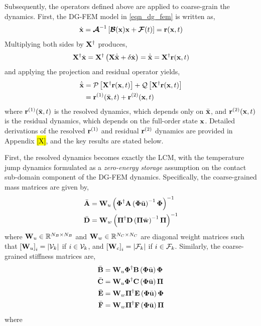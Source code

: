 Subsequently, the operators defined above are applied to coarse-grain the dynamics. First, the DG-FEM model in \cref{eqn_dg_fem} is written as,
\begin{equation}
    \dot{\mathbf{x}} = \boldsymbol{\mathcal{A}}^{-1}\left[\boldsymbol{\mathcal{B}}(\mathbf{x})\mathbf{x} + \boldsymbol{\mathcal{F}}(t)\right] = \mathbf{r}(\mathbf{x},t)
\end{equation}
Multiplying both sides by $\mathbf{X}^{\dagger}$ produces,
\begin{equation}
    \mathbf{X}^{\dagger}\dot{\mathbf{x}} = \mathbf{X}^{\dagger}\left(\mathbf{X}\dot{\bar{\mathbf{x}}} + \delta\dot{\mathbf{x}}\right) = \dot{\bar{\mathbf{x}}} = \mathbf{X}^{\dagger}\mathbf{r}(\mathbf{x},t)
\end{equation}
and applying the projection and residual operator yields,
\begin{subequations}
    \begin{align}
        \dot{\bar{\mathbf{x}}} &= \mathcal{P}\left[\mathbf{X}^{\dagger}\mathbf{r}(\mathbf{x},t)\right] + \mathcal{Q}\left[\mathbf{X}^{\dagger}\mathbf{r}(\mathbf{x},t)\right]\\
        &= \mathbf{r}^{(1)}(\bar{\mathbf{x}},t) + \mathbf{r}^{(2)}(\mathbf{x},t)
    \end{align}
\end{subequations}
where $\mathbf{r}^{(1)}(\bar{\mathbf{x}},t)$ is the resolved dynamics, which depends only on $\bar{\mathbf{x}}$, and $\mathbf{r}^{(2)}(\mathbf{x},t)$ is the residual dynamics, which depends on the full-order state $\mathbf{x}$. Detailed derivations of the resolved $\mathbf{r}^{(1)}$ and residual $\mathbf{r}^{(2)}$ dynamics are provided in Appendix \hl{[X]}, and the key results are stated below.

First, the resolved dynamics becomes exactly the LCM, with the temperature jump dynamics formulated as a \emph{zero-energy storage} assumption on the contact sub-domain component of the DG-FEM dynamics. Specifically, the coarse-grained mass matrices are given by,
\begin{subequations}
    \begin{align}
        \bar{\mathbf{A}} &= \mathbf{W}_u\left(\boldsymbol{\Phi}^{\dagger}\mathbf{A}\left(\boldsymbol{\Phi}\bar{\mathbf{u}}\right)^{-1}\boldsymbol{\Phi}\right)^{-1}\\
        \bar{\mathbf{D}} &= \mathbf{W}_w\left(\boldsymbol{\Pi}^{\dagger}\mathbf{D}\left(\boldsymbol{\Pi}\bar{\mathbf{w}}\right)^{-1}\boldsymbol{\Pi}\right)^{-1}
    \end{align}
\end{subequations}
where $\mathbf{W}_u\in\mathbb{R}^{N_B\times N_B}$ and $\mathbf{W}_w\in\mathbb{R}^{N_C\times N_C}$ are diagonal weight matrices such that $\left[\mathbf{W}_u\right]_{i} = \left|\mathcal{V}_k\right|$ if $i\in\mathcal{V}_k$, and $\left[\mathbf{W}_c\right]_i=\left|\mathcal{F}_k\right|$ if $i\in\mathcal{F}_k$. Similarly, the coarse-grained stiffness matrices are,
\begin{subequations}
    \begin{align}
        \bar{\mathbf{B}} &= \mathbf{W}_u\boldsymbol{\Phi}^{\dagger}\mathbf{B}\left(\boldsymbol{\Phi}\bar{\mathbf{u}}\right)\boldsymbol{\Phi}\\
        \bar{\mathbf{C}} &= \mathbf{W}_u\boldsymbol{\Phi}^{\dagger}\mathbf{C}\left(\boldsymbol{\Phi}\bar{\mathbf{u}}\right)\boldsymbol{\Pi}\\
        \bar{\mathbf{E}} &= \mathbf{W}_w\boldsymbol{\Pi}^{\dagger}\mathbf{E}\left(\boldsymbol{\Phi}\bar{\mathbf{u}}\right)\boldsymbol{\Phi}\\
        \bar{\mathbf{F}} &= \mathbf{W}_w\boldsymbol{\Pi}^{\dagger}\mathbf{F}\left(\boldsymbol{\Phi}\bar{\mathbf{u}}\right)\boldsymbol{\Pi}
    \end{align}
\end{subequations}
where

